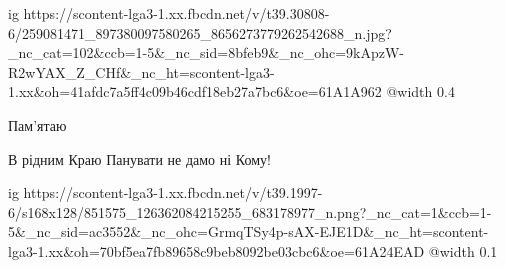  
 
 
 
 

\ifcmt
  ig https://scontent-lga3-1.xx.fbcdn.net/v/t39.30808-6/259081471_897380097580265_8656273779262542688_n.jpg?_nc_cat=102&ccb=1-5&_nc_sid=8bfeb9&_nc_ohc=9kApzW-R2wYAX_Z_CHf&_nc_ht=scontent-lga3-1.xx&oh=41afdc7a5ff4c09b46cdf18eb27a7bc6&oe=61A1A962
  @width 0.4
\fi

Пам'ятаю

В рідним Краю Панувати не дамо ні Кому!


\ifcmt
  ig https://scontent-lga3-1.xx.fbcdn.net/v/t39.1997-6/s168x128/851575_126362084215255_683178977_n.png?_nc_cat=1&ccb=1-5&_nc_sid=ac3552&_nc_ohc=GrmqTSy4p-sAX-EJE1D&_nc_ht=scontent-lga3-1.xx&oh=70bf5ea7fb89658c9beb8092be03cbc6&oe=61A24EAD
  @width 0.1
\fi
